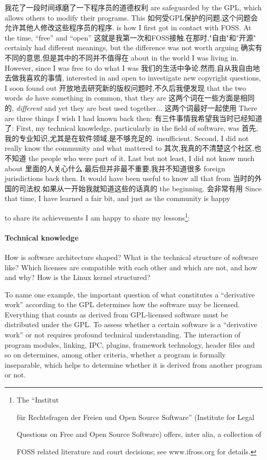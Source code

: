我花了一段时间琢磨了一下程序员的道德权利
are safeguarded by the GPL, which allows others to modify their programs. This
如何受GPL保护的问题,这个问题会允许其他人修改这些程序员的程序.
is how I first got in contact with FOSS. At the time, ``free'' and ``open''
这就是我第一次和FOSS接触.在那时,"自由"和"开源"
certainly had different meanings, but the difference was not worth arguing
确实有不同的意思,但是其中的不同并不值得在
about in the world I was living in. However, since I was free to do what I was
我们的生活中争论.然而,自从我自由地去做我喜欢的事情,
interested in and open to investigate new copyright questions, I soon found out
开放地去研究新的版权问题时,不久后我便发现
that the two words \textit{do} have something in common, that they are
这两个词在一些方面是相同的,
\textit{different} and yet they are best used together...
这两个词最好一起使用
There are three things I wish I had known back then:
有三件事情我希望我当时已经知道了:
First, my technical knowledge, particularly in the field of software, was
首先,我的专业知识,尤其是在软件领域,是不够充足的.
insufficient. Second, I did not really know the community and what mattered to
其次,我真的不清楚这个社区,也不知道
the people who were part of it. Last but not least, I did not know much about
里面的人关心什么.最后但并非最不重要,我并不知道很多
foreign jurisdictions back then. It would have been useful to know all that from
当时的外国的司法权.如果从一开始我就知道这些的话真的
the beginning.
会非常有用
Since that time, I have learned a fair bit, and just as the community is happy

to share its achievements I am happy to share my lessons\footnote{The ``Institut

f\"ur Rechtsfragen der Freien und Open Source Software'' (Institute for Legal

Questions on Free and Open Source Software) offers, inter alia, a collection of

FOSS related literature and court decisions; see www.ifross.org for details.}:

\paragraph*{Technical knowledge}
How is software architecture shaped? What is the technical structure of software
like? Which licenses are compatible with each other and which are not, and how
and why? How is the Linux kernel structured? 

To name one example, the important question of what constitutes a ``derivative
work'' according to the GPL determines how the software may be licensed.
Everything that counts as derived from GPL-licensed software must be distributed
under the GPL. To assess whether a certain software is a ``derivative work'' or
not requires profound technical understanding. The interaction of program
modules, linking, IPC, plugins, framework technology, header files and so on
determines, among other criteria, whether a program is formally inseparable,
which helps to determine whether it is derived from another program or not. 

